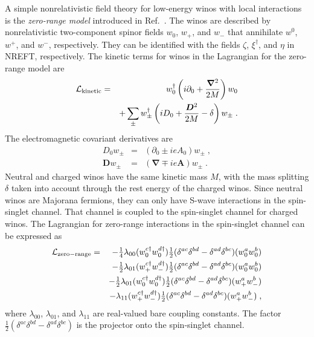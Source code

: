 \documentclass[%
 reprint,
 amsmath,amssymb,
 aps,
]{revtex4-1}
\begin{document}
A simple nonrelativistic field theory for low-energy winos with local interactions is the {\it zero-range model} introduced in Ref.~\cite{Braaten:2017gpq}.
The winos are described by nonrelativistic two-component spinor fields $w_0$, $w_+$, and $w_-$ that annihilate $w^0$, $w^+$, and $w^-$, respectively.
They can be identified with the fields $\zeta$, $\xi^\dagger$, and $\eta$ in NREFT, respectively.
The kinetic terms for winos in the Lagrangian for the zero-range model are
\begin{eqnarray}
\mathcal{L}_{\rm kinetic} &=& w_0^\dagger\left(i\partial_0+\frac{\bm{\nabla}^2}{2M}\right) w_0  
\nonumber\\
&& + \sum_\pm w_\pm^\dagger\left(iD_0+\frac{\bm{D}^2}{2M}-\delta\right) w_\pm \;.  
\label{eq:kineticL}
\end{eqnarray}
The electromagnetic covariant derivatives are
\begin{eqnarray}
D_0 w_\pm &=& (\partial_0 \pm ieA_0)w_\pm \;,
\nonumber\\
\bm{D} w_\pm &=& (\bm{\nabla} \mp ie\bm{A})w_\pm \;.
\end{eqnarray}
Neutral and charged winos have the same kinetic mass $M$, with the mass splitting $\delta$ taken into account through the rest energy of the charged winos.
Since neutral winos are Majorana fermions, they can only have S-wave interactions in the spin-singlet channel.
That channel is coupled to the spin-singlet channel for charged winos.
The Lagrangian for zero-range interactions in the spin-singlet channel can be expressed as
\begin{eqnarray}
\mathcal{L}_{\rm zero-range} &=& 
-\tfrac{1}{4} \lambda_{00} ( w_0^{c\dagger} w_0^{d\dagger} )
\tfrac12 ( \delta^{ac}\delta^{bd}- \delta^{ad}\delta^{bc}) ( w_0^a w_0^b )
\nonumber\\
&& 
-\tfrac{1}{2} \lambda_{01} (  w_+^{c\dagger} w_-^{d\dagger} )
\tfrac12 ( \delta^{ac}\delta^{bd}- \delta^{ad}\delta^{bc}) ( w_0^a w_0^b )
\nonumber\\
&& 
-\tfrac{1}{2} \lambda_{01} (  w_0^{c\dagger} w_0^{d\dagger} )
\tfrac12 ( \delta^{ac}\delta^{bd}- \delta^{ad}\delta^{bc}) ( w_+^a w_-^b )
\nonumber\\
&& 
- \lambda_{11} ( w_+^{c\dagger} w_-^{d\dagger} )
\tfrac12 ( \delta^{ac}\delta^{bd}- \delta^{ad}\delta^{bc})
( w_+^a w_-^b ) \;,
\nonumber\\
\label{eq:ZRint}
\end{eqnarray}
where $\lambda_{00}$, $\lambda_{01}$, and $\lambda_{11}$ are real-valued bare coupling constants.
The factor $\frac12( \delta^{ac}\delta^{bd}- \delta^{ad}\delta^{bc})$ is the projector onto the spin-singlet channel.
\end{document}
